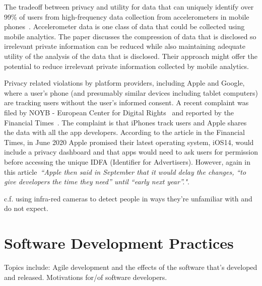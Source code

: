 The tradeoff between privacy and utility for data that can uniquely identify over 99\% of users from high-frequency data collection from accelerometers in mobile phones~\citep{menasria2018_purpose_driven_privacy_preservation_accelerometers}. Accelerometer data is one class of data that could be collected using mobile analytics. The paper discusses the compression of data that is disclosed so irrelevant private information can be reduced while also maintaining adequate utility of the analysis of the data that is disclosed. Their approach might offer the potential to reduce irrelevant private information collected by mobile analytics.

Privacy related violations by platform providers, including Apple and Google, where a user's phone (and presumably similar devices including tablet computers) are tracking users without the user's informed consent. A recent complaint was filed by NOYB - European Center for Digital Rights~\citep{noyb2020_noyb_files_complaint_against_apples_tracking_code_idfa} and reported by the Financial Times~\citep{ft2020_apple_tracks_iphone_users_without_consent}. The complaint is that iPhones track users and Apple shares the data with all the app developers. According to the article in the Financial Times, in June 2020 Apple promised their latest operating system, iOS14, would include a privacy dashboard and that apps would need to ask users for permission before accessing the unique IDFA (Identifier for Advertisers). However, again in this article~\emph{``Apple then said in September that it would delay the changes, “to give developers the time they need” until “early next year”."}. 



c.f. using infra-red cameras to detect people in ways they're unfamiliar with and do not expect. 

\section{Software Development Practices}

Topics include: Agile development and the effects of the software that's developed and released. Motivations for/of software developers.


